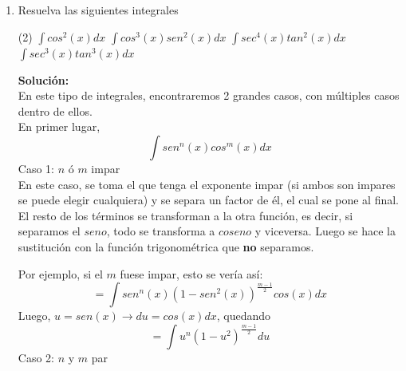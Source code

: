 \documentclass[12pt]{article}
\newenvironment{solucion}
{\begin{mdframed}[backgroundcolor=black!10]
		{\bf Solución:}\\
	}
	{
	\end{mdframed}
}
\newenvironment{preguntas}
{\begin{enumerate}\itemsep12pt
	}
	{
	\end{enumerate}
}
\newcommand{\ra}{\rightarrow}
\begin{document}
\begin{preguntas}
\begin{solucion}
\begin{enumerate}[a)]
$$			= x\ arctan(x) - \dfrac{1}{2}ln(w)$$
			$$= \ arctan(x) - \dfrac{1}{2}ln(1+x^2) + c$$
\item $\displaystyle\int ln(x)dx$\\\\
			En este caso,
			$$U = ln(x), \quad dv = dx \ra du = \dfrac{dx}{x}, \quad V = x$$
			Luego, 
			$$\displaystyle\int ln(x)dx
			= xln(x) - \displaystyle\int \dfrac{xdx}{x}
			= xln(x) - \displaystyle\int dx
			= xln(x) - x + c
			$$
\item $\displaystyle\int ln^2(x)dx$\\\\
			De la misma forma que antes
			$$U = ln^2(x), \quad dv = dx \ra du = 2ln(x)\dfrac{1}{x}dx, \quad V = x$$
			Con esto,
			$$\displaystyle\int ln^2(x)dx = xln^2(x) - 2\displaystyle\int ln(x)dx$$
			Por el ejercicio anterior sabemos que
			$$\displaystyle\int ln(x)dx = xln(x) -x$$
			Luego,
			$$=xln^2(x) - 2(xln(x) - x) + c$$
			Finalmente,
			$$\displaystyle\int ln^2(x)dx = xln^2(x) - 2xln(x) + x + c$$
\end{enumerate}
\end{solucion}
\item Resuelva las siguientes integrales
\begin{tasks}(2)
\task $\displaystyle\int cos^2(x)dx$
\task $\displaystyle\int cos^3(x)sen^2(x)dx$
\task $\displaystyle\int sec^4(x)tan^2(x)dx$
\task $\displaystyle\int sec^3(x)tan^3(x)dx$
\end{tasks}
\begin{solucion}
En este tipo de integrales, encontraremos 2 grandes casos, con múltiples casos dentro de ellos.\\

En primer lugar,
$$\displaystyle\int sen^n(x)cos^m(x)dx$$
Caso 1: $n$ ó $m$ impar\\

En este caso, se toma el que tenga el exponente impar (si ambos son impares se puede elegir cualquiera) y se separa un factor de él, el cual se pone al final. El resto de los términos se transforman a la otra función, es decir, si separamos el $seno$, todo se transforma a $coseno$ y viceversa. Luego se hace la sustitución con la función trigonométrica que \textbf{no} separamos.

Por ejemplo, si el $m$ fuese impar, esto se vería así:
$$= \displaystyle\int sen^n(x)(1-sen^2(x))^{\frac{m-1}{2}}cos(x)dx$$
Luego, $u = sen(x) \ra du = cos(x)dx$, quedando
$$= \displaystyle\int u^n(1-u^2)^{\frac{m-1}{2}}du$$
Caso 2: $n$ y $m$ par\\


\end{solucion}
\end{preguntas}
\end{document}
